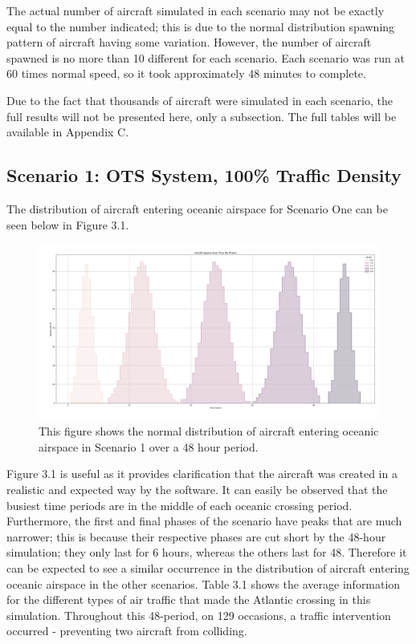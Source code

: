 \documentclass[stu, a4paper, 12pt, floatsintext]{apa7}
\numberwithin{figure}{section}
\numberwithin{table}{section}
\numberwithin{equation}{section}
\begin{document}
The actual number of aircraft simulated in each scenario may not be exactly equal to the number indicated; this is due to the normal distribution spawning pattern of aircraft having some variation. However, the number of aircraft spawned is no more than 10 different for each scenario. Each scenario was run at 60 times normal speed, so it took approximately 48 minutes to complete. 

Due to the fact that thousands of aircraft were simulated in each scenario, the full results will not be presented here, only a subsection. The full tables will be available in Appendix C.  
\subsection{Scenario 1: OTS System, 100\% Traffic Density}
The distribution of aircraft entering oceanic airspace for Scenario One can be seen below in Figure 3.1.
\begin{figure}[H]
    \caption{This figure shows the normal distribution of aircraft entering oceanic airspace in Scenario 1 over a 48 hour period.}
    \label{fig:3.1}
    \centering
    \includegraphics[width=1.1\textwidth]{pictures/Figure 3.1.png}    
\end{figure}
Figure 3.1 is useful as it provides clarification that the aircraft was created in a realistic and expected way by the software. It can easily be observed that the busiest time periods are in the middle of each oceanic crossing period. Furthermore, the first and final phases of the scenario have peaks that are much narrower; this is because their respective phases are cut short by the 48-hour simulation; they only last for 6 hours, whereas the others last for 48. Therefore it can be expected to see a similar occurrence in the distribution of aircraft entering oceanic airspace in the other scenarios.
Table 3.1 shows the average information for the different types of air traffic that made the Atlantic crossing in this simulation. Throughout this 48-period, on 129 occasions, a traffic intervention occurred - preventing two aircraft from colliding. 
\end{document}
